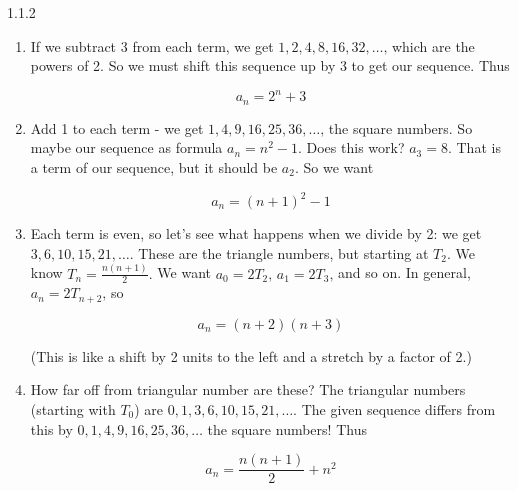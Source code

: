 \documentclass[11pt,]{book}
\theoremstyle{ptxplainnotitle}
\theoremstyle{ptxplaintitle}
\theoremstyle{ptxdefinitionnotitle}
\theoremstyle{ptxdefinitiontitle}
\theoremstyle{ptxdefinitionnotitle}
\theoremstyle{ptxdefinitiontitle}
\theoremstyle{ptxdefinitionnotitle}
\theoremstyle{ptxdefinitiontitle}
\theoremstyle{ptxdefinitiontitlenonumber}
\theoremstyle{ptxdefinitiontitlenonumber}
\numberwithin{equation}{chapter}
\begin{document}
\begin{divisionexercise}{1.1.2}
\textbf{}\hypertarget{p-111}{}%
\leavevmode%
\begin{enumerate}[label=(\alph*)]
\item\hypertarget{li-78}{}\hypertarget{p-112}{}%
If we subtract 3 from each term, we get \(1, 2, 4, 8, 16, 32, \ldots\text{,}\) which are the powers of 2. So we must shift this sequence up by 3 to get our sequence. Thus%
\par
\hypertarget{p-113}{}%
%
\begin{equation*}
a_n = 2^n + 3
\end{equation*}
%
\item\hypertarget{li-79}{}\hypertarget{p-114}{}%
Add 1 to each term - we get \(1, 4, 9, 16, 25, 36, \ldots\text{,}\) the square numbers. So maybe our sequence as formula \(a_n = n^2 - 1\text{.}\) Does this work? \(a_3 = 8\text{.}\) That is a term of our sequence, but it should be \(a_2\text{.}\) So we want%
\par
\hypertarget{p-115}{}%
%
\begin{equation*}
a_n = (n+1)^2 - 1
\end{equation*}
%
\item\hypertarget{li-80}{}\hypertarget{p-116}{}%
Each term is even, so let's see what happens when we divide by 2: we get \(3, 6, 10, 15, 21,\ldots\text{.}\) These are the triangle numbers, but starting at \(T_2\text{.}\) We know \(T_n = \frac{n(n+1)}{2}\text{.}\) We want \(a_0 = 2T_2\text{,}\) \(a_1 = 2T_3\text{,}\) and so on. In general, \(a_n = 2T_{n+2}\text{,}\) so%
\par
\hypertarget{p-117}{}%
%
\begin{equation*}
a_n = (n+2)(n+3)
\end{equation*}
%
\par
\hypertarget{p-118}{}%
(This is like a shift by 2 units to the left and a stretch by a factor of 2.)%
\item\hypertarget{li-81}{}\hypertarget{p-119}{}%
How far off from triangular number are these? The triangular numbers (starting with \(T_0\)) are \(0, 1, 3, 6, 10, 15, 21, \ldots\text{.}\) The given sequence differs from this by \(0, 1, 4, 9, 16, 25, 36, \ldots\) the square numbers! Thus%
\par
\hypertarget{p-120}{}%
%
\begin{equation*}
a_n = \frac{n(n+1)}{2} + n^2
\end{equation*}
%
\end{enumerate}
%
\end{divisionexercise}%
\end{document}
